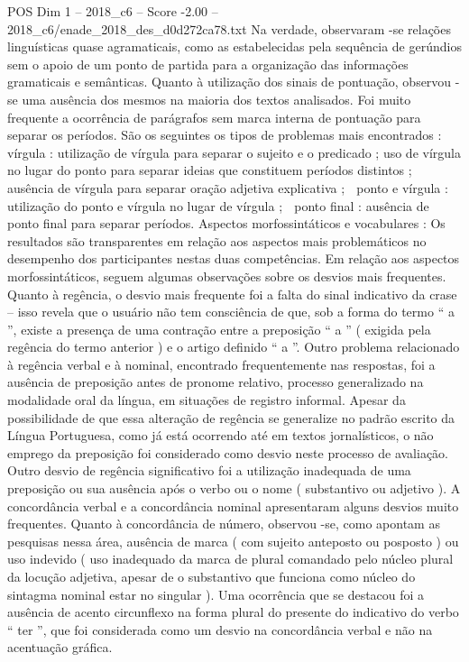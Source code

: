 \begin{textsample}{POS Dim 1 – 2018\_c6 – Score -2.00 – 2018\_c6/enade\_2018\_des\_d0d272ca78.txt}
Na verdade, observaram -se relações linguísticas quase agramaticais, como as estabelecidas pela sequência de gerúndios sem o apoio de um ponto de partida para a organização das informações gramaticais e semânticas.
Quanto à utilização dos sinais de pontuação, observou -se uma ausência dos mesmos na maioria dos textos analisados.
Foi muito frequente a ocorrência de parágrafos sem marca interna de pontuação para separar os períodos.
São os seguintes os tipos de problemas mais encontrados :  vírgula : utilização de vírgula para separar o sujeito e o predicado ; uso de vírgula no lugar do ponto para separar ideias que constituem períodos distintos ; ausência de vírgula para separar oração adjetiva explicativa ;  ponto e vírgula : utilização do ponto e vírgula no lugar de vírgula ;  ponto final : ausência de ponto final para separar períodos.
Aspectos morfossintáticos e vocabulares : Os resultados são transparentes em relação aos aspectos mais problemáticos no desempenho dos participantes nestas duas competências.
Em relação aos aspectos morfossintáticos, seguem algumas observações sobre os desvios mais frequentes.
Quanto à regência, o desvio mais frequente foi a falta do sinal indicativo da crase – isso revela que o usuário não tem consciência de que, sob a forma do termo “ a ”, existe a presença de uma contração entre a preposição “ a ” ( exigida pela regência do termo anterior ) e o artigo definido “ a ”.
Outro problema relacionado à regência verbal e à nominal, encontrado frequentemente nas respostas, foi a ausência de preposição antes de pronome relativo, processo generalizado na modalidade oral da língua, em situações de registro informal.
Apesar da possibilidade de que essa alteração de regência se generalize no padrão escrito da Língua Portuguesa, como já está ocorrendo até em textos jornalísticos, o não emprego da preposição foi considerado como desvio neste processo de avaliação.
Outro desvio de regência significativo foi a utilização inadequada de uma preposição ou sua ausência após o verbo ou o nome ( substantivo ou adjetivo ).
A concordância verbal e a concordância nominal apresentaram alguns desvios muito frequentes.
Quanto à concordância de número, observou -se, como apontam as pesquisas nessa área, ausência de marca ( com sujeito anteposto ou posposto ) ou uso indevido ( uso inadequado da marca de plural comandado pelo núcleo plural da locução adjetiva, apesar de o substantivo que funciona como núcleo do sintagma nominal estar no singular ).
Uma ocorrência que se destacou foi a ausência de acento circunflexo na forma plural do presente do indicativo do verbo “ ter ”, que foi considerada como um desvio na concordância verbal e não na acentuação gráfica.

\end{textsample}

